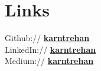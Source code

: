 \documentclass[]{deedy-resume-reversed}
\begin{document}
\begin{minipage}[t]{0.33\textwidth}

\section{Links}
Github:// \href{https://github.com/karntrehan}{\bf karntrehan} \\
LinkedIn://  \href{https://www.linkedin.com/in/karntrehan}{\bf karntrehan} \\
Medium://  \href{https://medium.com/@karntrehan}{\bf karntrehan}
\sectionsep

\end{minipage}
\end{document}
